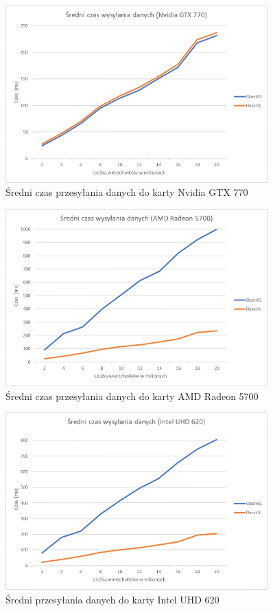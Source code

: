 \documentclass[archive]{mgr}
\begin{document}
\begin{figure}[h!]
  \centering
    \includegraphics[width=0.9\textwidth]{images/data/1.png}
   \caption{Średni czas przesyłania danych do karty Nvidia GTX 770}
   \label{lab:61}
\end{figure}
\newpage

\begin{figure}[h!]
  \centering
    \includegraphics[width=0.9\textwidth]{images/data/2.png}
   \caption{Średni czas przesyłania danych do karty AMD Radeon 5700}
   \label{lab:62}
\end{figure}
\bigbreak
\begin{figure}[h!]
  \centering
    \includegraphics[width=0.9\textwidth]{images/data/3.png}
   \caption{Średni przesyłania danych do karty Intel UHD 620}
   \label{lab:63}
\end{figure}
\newpage
\end{document}
